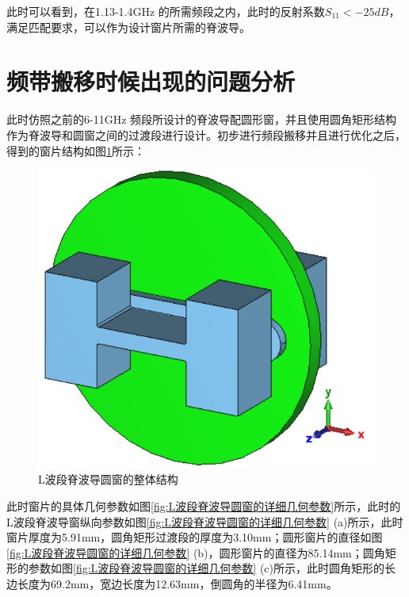\documentclass[master]{thesis-uestc}
\begin{document}
此时可以看到，在1.13-1.4GHz 的所需频段之内，此时的反射系数$S_{11}<-25dB$，满足匹配要求，可以作为设计窗片所需的脊波导。
\section{频带搬移时候出现的问题分析}\label{sec:频带搬移时候出现的问题分析}
此时仿照之前的6-11GHz 频段所设计的脊波导配圆形窗，并且使用圆角矩形结构作为脊波导和圆窗之间的过渡段进行设计。初步进行频段搬移并且进行优化之后，得到的窗片结构如图\ref{fig:L波段脊波导圆窗的整体结构}所示：
\begin{figure}[!htb]
    \centering
    \includegraphics[width=0.35\linewidth]{pic/chapter4/L波段脊波导圆窗的整体结构.png}
    \caption{L波段脊波导圆窗的整体结构}
    \label{fig:L波段脊波导圆窗的整体结构}
\end{figure}

此时窗片的具体几何参数如图\ref{fig:L波段脊波导圆窗的详细几何参数}所示，此时的L波段脊波导窗纵向参数如图\ref{fig:L波段脊波导圆窗的详细几何参数} (a)所示，此时窗片厚度为5.91mm，圆角矩形过渡段的厚度为3.10mm；圆形窗片的直径如图\ref{fig:L波段脊波导圆窗的详细几何参数} (b)，圆形窗片的直径为85.14mm；圆角矩形的参数如图\ref{fig:L波段脊波导圆窗的详细几何参数} (c)所示，此时圆角矩形的长边长度为69.2mm，宽边长度为12.63mm，倒圆角的半径为6.41mm。
\end{document}
